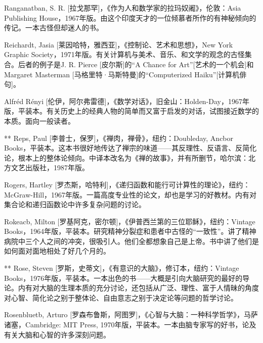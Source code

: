 \begin{thebib}
\begin{biblist}
\item Ranganatban, S. R. [拉戈那罕]，《作为人和数学家的拉玛奴阇》，伦敦：Asia Publishing House，1967年版。由这个印度天才的一位倾慕者所作的有神秘倾向的传记。一本古怪但却迷人的书。

\item Reichardt, Jasia [莱因哈特，雅西亚]，《控制论、艺术和思想》，New York Graphic Society，1971年版。有关计算机与美术、音乐、和文学的观念的古怪集合。后者的例子是J. R. Pierce [皮尔斯]的“A Chance for Art”[艺术的一个机会]和Margaret Masterman [马格里特·马斯特曼]的“Computerized Haiku”[计算机俳句]。

\item Alfréd Rényi [伦伊，阿尔弗雷德]，《数学对话》，旧金山：Holden-Day，1967年版，平装本。有关历史上的经典人物的简单而又富于启发的对话，试图接近数学的本质。面向一般读者。

\item[**] Reps, Paul [李普士，保罗]，《禅肉，禅骨》，纽约：Doubleday, Ancbor Books，平装本。这本书很好地传达了禅宗的味道——其反理性、反语言、反简化论，根本上的整体论倾向。中译本改名为《禅的故事》，并有所删节，哈尔滨：北方文艺出版社，1987年版。

\item Rogers, Hartley [罗杰斯，哈特利]，《递归函数和能行可计算性的理论》，纽约：McGraw-Hill，1967年版。一篇高度专业性的论文，却也是学习的好教材。内有对集合论和递归函数论中许多复杂问题的讨论。

\item Rokeacb, Milton [罗基阿克，密尔顿]，《伊普西兰第的三位耶稣》，纽约：Vintage Books，1964年版，平装本。研究精神分裂症和患者中古怪的“一致性”。讲了精神病院中三个人之间的冲突，很吸引人。他们全都想象自己是上帝。书中讲了他们是如何面对面地相处了好几个月的。

\item[**] Rose, Steven [罗斯，史蒂文]，《有意识的大脑》，修订本，纽约：Vintage Books，1976年版，平装本。一本出色的书——大概是引向大脑研究的最好的导论。内有对大脑的生理本质的充分讨论，还包括从广泛、理性、富于人情昧的角度对心智、简化论之别于整体论、自由意志之别于决定论等问题的哲学讨论。

\item Rosenbluetb, Arturo [罗森布鲁斯，阿图罗]，《心智与大脑：一种科学哲学》，马萨诸塞，Cambridge: MIT Press, 1970年版，平装本。一本由脑专家写的好书，论及有关大脑和心智的许多深刻问题。


\end{biblist}
\end{thebib}
